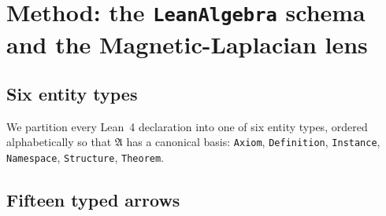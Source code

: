 \documentclass[11pt]{article}
\newcommand{\magA}{\mathfrak{A}}
\begin{document}
\section{Method: the \texttt{LeanAlgebra} schema and the Magnetic-Laplacian lens}
\label{sec:algebra}

\subsection{Six entity types}

We partition every Lean~4 declaration into one of six entity types,
ordered alphabetically so that $\magA$ has a canonical basis:
\lstinline|Axiom|, \lstinline|Definition|, \lstinline|Instance|,
\lstinline|Namespace|, \lstinline|Structure|, \lstinline|Theorem|.

\subsection{Fifteen typed arrows}
\end{document}
